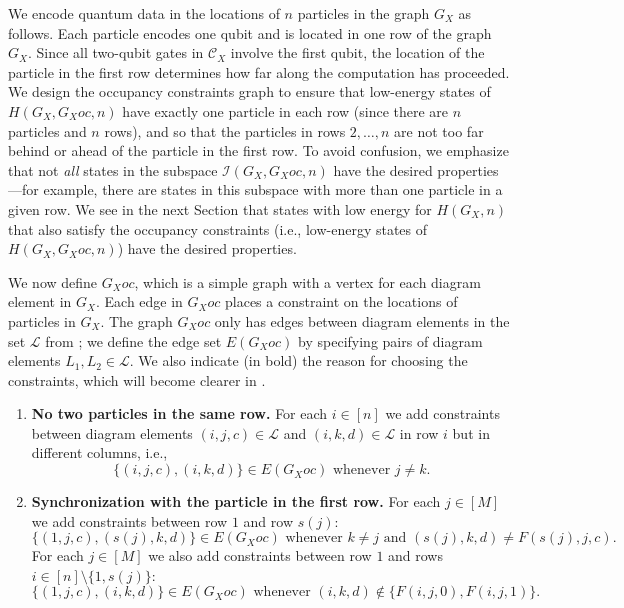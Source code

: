 \documentclass[../thesis-main/thesis-main]{subfiles}
\begin{document}
We encode quantum data in the locations of $n$ particles in the graph $G_X$ as follows. Each particle encodes one qubit and is located in one row of the graph $G_X$. Since all two-qubit gates in $\mathcal{C}_{X}$ involve the first qubit, the location of the particle in the first row determines how far along the computation has proceeded. We design the occupancy constraints graph to ensure that low-energy states of $H(G_X,G_Xoc,n)$ have exactly one particle in each row (since there are $n$ particles and $n$ rows), and so that the particles in rows $2,\ldots,n$ are not too far behind or ahead of the particle in the first row. To avoid confusion, we emphasize that not \emph{all} states in the subspace $\mathcal{I}(G_X,G_Xoc,n)$ have the desired properties---for example, there are states in this subspace with more than one particle in a given row. We see in the next Section that states with low energy for $H(G_X,n)$ that also satisfy the occupancy constraints (i.e., low-energy states of $H(G_X,G_Xoc,n)$) have the desired properties.

We now define $G_Xoc$, which is a simple graph with a vertex for each diagram element in $G_X$. Each edge in $G_Xoc$ places a constraint on the locations of particles in $G_X$. The graph $G_Xoc$ only has edges between diagram elements in the set $\mathcal{L}$ from ; we define the edge set $E(G_Xoc)$ by specifying pairs of diagram elements $L_{1},L_{2}\in\mathcal{L}$. We also indicate (in bold) the reason for choosing the constraints, which will become clearer in .
\begin{enumerate}
\item \textbf{No two particles in the same row.} For each $i\in[n]$ we add constraints between diagram elements $(i,j,c)\in\mathcal{L}$ and $(i,k,d)\in\mathcal{L}$ in row $i$ but in different columns, i.e.,
\begin{equation}
\{\left(i,j,c\right),\left(i,k,d\right)\}\in E(G_Xoc)\text{ whenever }j\neq k.\label{eq:occ_constraints_type1}
\end{equation}
\item \textbf{Synchronization with the particle in the first row.} For each $j\in[M]$ we add constraints between row $1$ and row $s(j)$:
\[
\{(1,j,c),(s(j),k,d)\}\in E(G_Xoc)\text{ whenever }k\neq j\text{ and }(s(j),k,d)\neq F(s(j),j,c).
\]
For each $j\in[M]$ we also add constraints between row $1$ and rows $i\in[n]\setminus\{1,s(j)\}$:
\[
\{(1,j,c),(i,k,d)\}\in E(G_Xoc)\text{ whenever }(i,k,d)\notin\{F(i,j,0),F(i,j,1)\}.
\]
\end{enumerate}
\end{document}
